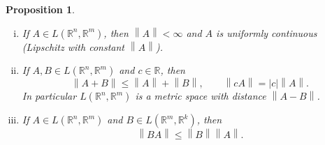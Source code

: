 \documentclass[12pt]{book}
\newcommand{\abs}[1]{\left\lvert {#1} \right\rvert}
\newcommand{\norm}[1]{\left\lVert {#1} \right\rVert}
\newcommand{\R}{{\mathbb{R}}}
\theoremstyle{plain}
\newtheorem{prop}[thm]{Proposition}
\theoremstyle{remark}
\theoremstyle{definition}
\theoremstyle{exercise}
\theoremstyle{example}
\begin{document}
\begin{prop}
{\ }
\begin{enumerate}[(i)]
\item If $A \in L(\R^n,\R^m)$, then $\norm{A} < \infty$ and
$A$ is uniformly continuous (Lipschitz with constant $\norm{A}$).
\item If $A,B \in L(\R^n,\R^m)$ and $c \in \R$, then
\begin{equation*}
\norm{A+B} \leq \norm{A}+\norm{B}, \qquad \norm{cA} = \abs{c}\norm{A} .
\end{equation*}
In particular $L(\R^n,\R^m)$ is a metric space with distance $\norm{A-B}$.
\item 
If $A \in L(\R^n,\R^m)$ and $B \in L(\R^m,\R^k)$, then
\begin{equation*}
\norm{BA} \leq \norm{B} \norm{A} .
\end{equation*}
\end{enumerate}
\end{prop}
\end{document}
